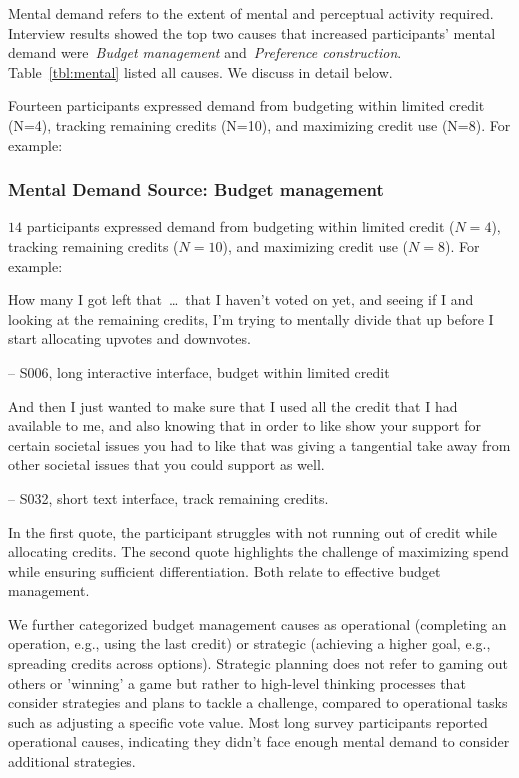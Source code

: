 Mental demand refers to the extent of mental and perceptual activity required. Interview results showed the top two causes that increased participants' mental demand were~\textit{Budget management} and~\textit{Preference construction}. Table~\ref{tbl:mental} listed all causes. We discuss in detail below.

Fourteen participants expressed demand from budgeting within limited credit (N=4), tracking remaining credits (N=10), and maximizing credit use (N=8). For example:

\subsubsection{Mental Demand Source: Budget management} $14$ participants expressed demand from budgeting within limited credit ($N=4$), tracking remaining credits ($N=10$), and maximizing credit use ($N=8$). For example:

\begin{displayquote}
How many I got left that~\ldots\ that I haven't voted on yet, and seeing if I and looking at the remaining credits, I'm trying to mentally divide that up before I start allocating upvotes and downvotes.

\small{\noindent \hfill -- S006, long interactive interface, budget within limited credit}
\end{displayquote}

\begin{displayquote}
And then I just wanted to make sure that I used all the credit that I had available to me, and also knowing that in order to like show your support for certain societal issues you had to like that was giving a tangential take away from other societal issues that you could support as well.
    
\noindent \hfill -- S032, short text interface, track remaining credits.
\end{displayquote}

In the first quote, the participant struggles with not running out of credit while allocating credits. The second quote highlights the challenge of maximizing spend while ensuring sufficient differentiation. Both relate to effective budget management.

We further categorized budget management causes as operational (completing an operation, e.g., using the last credit) or strategic (achieving a higher goal, e.g., spreading credits across options). Strategic planning does not refer to gaming out others or 'winning' a game but rather to high-level thinking processes that consider strategies and plans to tackle a challenge, compared to operational tasks such as adjusting a specific vote value. Most long survey participants reported operational causes, indicating they didn't face enough mental demand to consider additional strategies.

